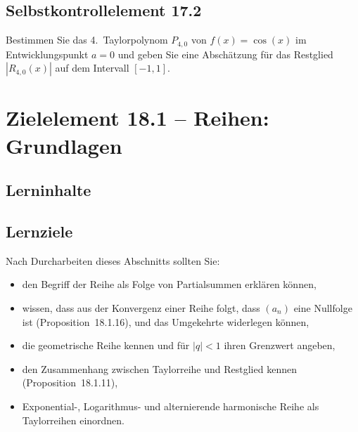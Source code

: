 \documentclass[a4paper,12pt]{article}
\begin{document}
\subsection*{Selbstkontrollelement 17.2}

Bestimmen Sie das 4.\ Taylorpolynom $P_{4,0}$ von $f(x) = \cos(x)$ im
Entwicklungspunkt $a = 0$ und geben Sie eine Abschätzung für das Restglied
$|R_{4,0}(x)|$ auf dem Intervall $[-1, 1]$.

\newpage

\section*{Zielelement 18.1 -- Reihen: Grundlagen}

\subsection*{Lerninhalte}

\begin{center}
\end{center}

\subsection*{Lernziele}

Nach Durcharbeiten dieses Abschnitts sollten Sie:
\begin{itemize}
  \item den Begriff der Reihe als Folge von Partialsummen erklären können,
  \item wissen, dass aus der Konvergenz einer Reihe folgt, dass $(a_n)$ eine
        Nullfolge ist (Proposition~18.1.16), und das Umgekehrte widerlegen können,
  \item die geometrische Reihe kennen und für $|q| < 1$ ihren Grenzwert angeben,
  \item den Zusammenhang zwischen Taylorreihe und Restglied kennen
        (Proposition~18.1.11),
  \item Exponential-, Logarithmus- und alternierende harmonische Reihe als
        Taylorreihen einordnen.
\end{itemize}
\end{document}
